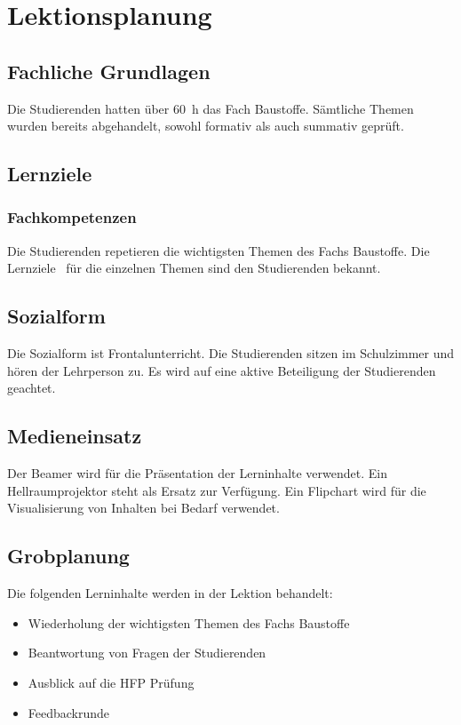 \documentclass[
11pt,
captions=tableheading,
headsepline,
footsepline, 
captions=tableheading,
parskip=half-,
]{scrartcl}
\begin{document}
\clearpage


\section{Lektionsplanung}
\subsection{Fachliche Grundlagen}
Die Studierenden hatten über \SI{60}{\hour} das Fach Baustoffe. 
Sämtliche Themen wurden bereits abgehandelt, sowohl formativ als auch summativ geprüft. 



\subsection{Lernziele}
\subsubsection{Fachkompetenzen}
Die Studierenden repetieren die wichtigsten Themen des Fachs Baustoffe.
Die Lernziele \faBullseye\, für die einzelnen Themen sind den Studierenden bekannt.



\subsection{Sozialform}
Die Sozialform ist Frontalunterricht. Die Studierenden sitzen im Schulzimmer und hören der Lehrperson zu. Es wird auf eine aktive Beteiligung der Studierenden geachtet.

\subsection{Medieneinsatz}
Der Beamer wird für die Präsentation der Lerninhalte verwendet. Ein Hellraumprojektor steht als Ersatz zur Verfügung. Ein Flipchart wird für die Visualisierung von Inhalten bei Bedarf verwendet.

\subsection{Grobplanung}
Die folgenden Lerninhalte werden in der Lektion behandelt:
\begin{itemize}
    \item Wiederholung der wichtigsten Themen des Fachs Baustoffe
    \item Beantwortung von Fragen der Studierenden
    \item Ausblick auf die HFP Prüfung
    \item Feedbackrunde
\end{itemize}
\end{document}
